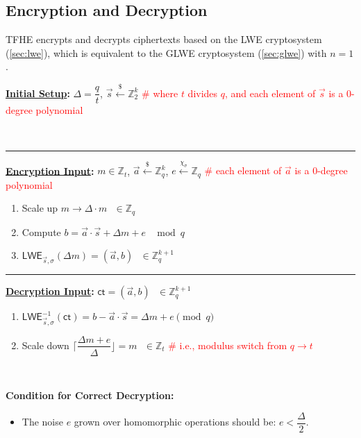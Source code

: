 \subsection{Encryption and Decryption}
\label{subsec:tfhe-enc-dec}

TFHE encrypts and decrypts ciphertexts based on the LWE cryptosystem (\autoref{sec:lwe}), which is equivalent to the GLWE cryptosystem (\autoref{sec:glwe}) with $n = 1$.


\begin{tcolorbox}[title={\textbf{\tboxlabel{\ref*{subsec:tfhe-enc-dec}} TFHE Encryption and Decryption}}]
\textbf{\underline{Initial Setup}:} $\Delta = \dfrac{q}{t}$, $\vec{s} \xleftarrow{\$} \mathbb{Z}_2^k$  \textcolor{red}{\# where $t$ divides $q$, and each element of $\vec{s}$ is a 0-degree polynomial}

$ $

\par\noindent\rule{\textwidth}{0.4pt}

\textbf{\underline{Encryption Input}:} $m \in \mathbb{Z}_t$, $\vec{a} \xleftarrow{\$} \mathbb{Z}_q^k$, $e \xleftarrow{\chi_\sigma} \mathbb{Z}_q$ \textcolor{red}{\# each element of $\vec{a}$ is a 0-degree polynomial}
\begin{enumerate}
\item Scale up $m \longrightarrow \Delta \cdot m \text{ } \in \mathbb{Z}_q$

\item Compute $b = \vec{a} \cdot \vec{s} + \Delta  m + e \text{ } \bmod q$
\item $\textsf{LWE}_{\vec{s},\sigma}(\Delta  m) = (\vec{a}, b) \text{ } \in \mathbb{Z}_q^{k + 1}$ 
\end{enumerate}

\par\noindent\rule{\textwidth}{0.4pt}

\textbf{\underline{Decryption Input}:} $\textsf{ct} = (\vec{a}, b) \text{ } \in \mathbb{Z}_q^{k+1}$
\begin{enumerate}
\item $\textsf{LWE}^{-1}_{\vec{s},\sigma}(\textsf{ct}) = b - \vec{a}\cdot \vec{s} = \Delta  m + e  \pmod q$

\item Scale down $\Bigg\lceil\dfrac{ \Delta  m + e } {\Delta}\Bigg\rfloor = m \text{ } \in \mathbb{Z}_t$ \textcolor{red}{ \# i.e., modulus switch from $q \rightarrow t$}
\end{enumerate}

$ $

\textbf{{Condition for Correct Decryption}:}
\begin{itemize}
\item The noise $e$ grown over homomorphic operations should be: $e < \dfrac{\Delta}{2}$. 
\end{itemize}

\end{tcolorbox}

